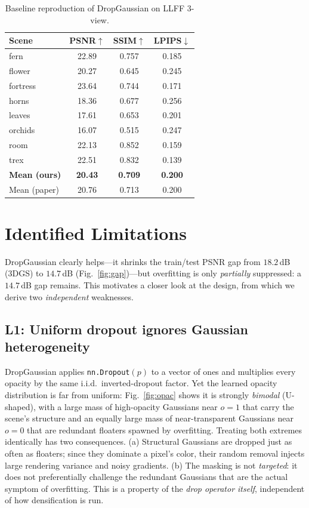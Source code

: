 \documentclass[conference]{IEEEtran}
\begin{document}
\begin{table}[t]
\caption{Baseline reproduction of DropGaussian on LLFF 3-view.}
\label{tab:repro}
\centering
\small
\begin{tabular}{lccc}
\toprule
Scene & PSNR$\uparrow$ & SSIM$\uparrow$ & LPIPS$\downarrow$ \\
\midrule
fern     & 22.89 & 0.757 & 0.185 \\
flower   & 20.27 & 0.645 & 0.245 \\
fortress & 23.64 & 0.744 & 0.171 \\
horns    & 18.36 & 0.677 & 0.256 \\
leaves   & 17.61 & 0.653 & 0.201 \\
orchids  & 16.07 & 0.515 & 0.247 \\
room     & 22.13 & 0.852 & 0.159 \\
trex     & 22.51 & 0.832 & 0.139 \\
\midrule
\textbf{Mean (ours)}  & \textbf{20.43} & \textbf{0.709} & \textbf{0.200} \\
Mean (paper)          & 20.76 & 0.713 & 0.200 \\
\bottomrule
\end{tabular}
\end{table}

\section{Identified Limitations}
\label{sec:limitations}
DropGaussian clearly helps---it shrinks the train/test PSNR gap from $18.2$\,dB
(3DGS) to $14.7$\,dB (Fig.~\ref{fig:gap})---but overfitting is only \emph{partially}
suppressed: a $14.7$\,dB gap remains. This motivates a closer look at the design, from
which we derive two \emph{independent} weaknesses.

\subsection{L1: Uniform dropout ignores Gaussian heterogeneity}
DropGaussian applies \texttt{nn.Dropout}$(p)$ to a vector of ones and multiplies every
opacity by the same i.i.d.\ inverted-dropout factor. Yet the learned opacity
distribution is far from uniform: Fig.~\ref{fig:opac} shows it is strongly
\emph{bimodal} (U-shaped), with a large mass of high-opacity Gaussians near $o=1$ that
carry the scene's structure and an equally large mass of near-transparent Gaussians
near $o=0$ that are redundant floaters spawned by overfitting. Treating both extremes
identically has two consequences. (a) Structural Gaussians are dropped just as often as
floaters; since they dominate a pixel's color, their random removal injects large
rendering variance and noisy gradients. (b) The masking is not \emph{targeted}: it does
not preferentially challenge the redundant Gaussians that are the actual symptom of
overfitting. This is a property of the \emph{drop operator itself}, independent of how
densification is run.
\end{document}
